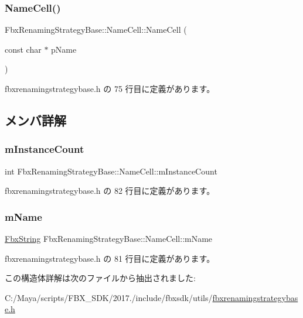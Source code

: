 \subsubsection{\texorpdfstring{Name\+Cell()}{NameCell()}}
{\footnotesize\ttfamily Fbx\+Renaming\+Strategy\+Base\+::\+Name\+Cell\+::\+Name\+Cell (\begin{DoxyParamCaption}\item[{const char $\ast$}]{p\+Name }\end{DoxyParamCaption})\hspace{0.3cm}{\ttfamily [inline]}}



 fbxrenamingstrategybase.\+h の 75 行目に定義があります。



\subsection{メンバ詳解}
\mbox{\label{struct_fbx_renaming_strategy_base_1_1_name_cell_a5f9f539c454fbc1a08e90b59618016b7}} 
\subsubsection{\texorpdfstring{m\+Instance\+Count}{mInstanceCount}}
{\footnotesize\ttfamily int Fbx\+Renaming\+Strategy\+Base\+::\+Name\+Cell\+::m\+Instance\+Count}



 fbxrenamingstrategybase.\+h の 82 行目に定義があります。

\mbox{\label{struct_fbx_renaming_strategy_base_1_1_name_cell_ac58a51c6b6e8b2bcd2f0fe2e34fdd83e}} 
\subsubsection{\texorpdfstring{m\+Name}{mName}}
{\footnotesize\ttfamily \hyperlink{class_fbx_string}{Fbx\+String} Fbx\+Renaming\+Strategy\+Base\+::\+Name\+Cell\+::m\+Name}



 fbxrenamingstrategybase.\+h の 81 行目に定義があります。



この構造体詳解は次のファイルから抽出されました\+:\begin{DoxyCompactItemize}
\item 
C\+:/\+Maya/scripts/\+F\+B\+X\+\_\+\+S\+D\+K/2017./include/fbxsdk/utils/\hyperlink{fbxrenamingstrategybase_8h}{fbxrenamingstrategybase.\+h}\end{DoxyCompactItemize}
